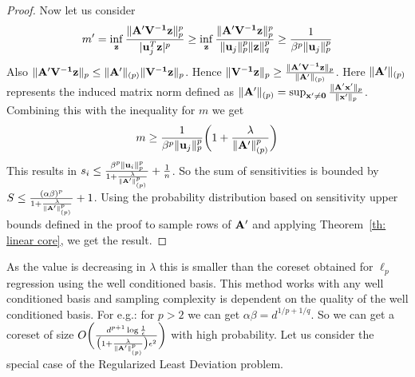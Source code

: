 \begin{proof}
Now let us consider
$$m'=\inf_{\mathbf{z}}\frac{\|\mathbf{A'V^{-1}z}\|_p^p}{|\mathbf{u}_j^T\mathbf{z}|^p}
\geq \inf_{\mathbf{z}}\frac{\|\mathbf{A'V^{-1}z}\|_p^p}{\|\mathbf{u}_j\|_p^p\|\mathbf{z}\|_q^p}
\geq \frac{1}{\beta^p \|\mathbf{u}_j\|_p^p}$$
Also  $\|\mathbf{A'V^{-1}z}\|_p \leq \|\mathbf{A'}\|_{(p)}\|\mathbf{V^{-1}z}\|_p$. Hence $\|\mathbf{V^{-1}z}\|_p \geq \frac{\|\mathbf{A'V^{-1}z}\|_p}{\|\mathbf{A'}\|_{(p)}}$. Here $\|\mathbf{A'}\|_{(p)}$ represents the induced matrix norm defined as $\|\mathbf{A'}\|_{(p)}= \sup_{\mathbf{x'} \neq \mathbf{0}}\frac{\|\mathbf{A'x'}\|_p}{\|\mathbf{x'}\|_p}$. Combining this with the inequality for $m$ we get
\begin{equation*}
m \geq \frac{1}{\beta^p\|\mathbf{u}_j\|_p^p}\bigg(1+ \frac{\lambda}{\|\mathbf{A'}\|_{(p)}^p}\bigg) 
\end{equation*}
This results in $s_i \leq \frac{\beta^p\|\mathbf{u}_i\|_p^p}{1+ \frac{\lambda}{\|\mathbf{A'}\|_{(p)}^p}}+ \frac{1}{n}$.  So the sum of sensitivities is bounded by $S \leq \frac{(\alpha\beta)^p}{1+ \frac{\lambda}{\|\mathbf{A'}\|_{(p)}^p}} +1 $.
Using the probability distribution based on sensitivity upper bounds defined in the proof to sample rows of $\mathbf{A'}$ and applying Theorem~\ref{th: linear core}, we get the result. 
\end{proof}
% 
As the value is decreasing in $\lambda$ this is smaller than the coreset obtained for $\ell_p$ regression using the well conditioned basis. This method works with any well conditioned basis and sampling complexity is dependent on the quality of the well conditioned basis. For e.g.: for $p >2$ we can get $\alpha\beta = d^{1/p + 1/q}$. So we can get a coreset of size $O\bigg(\frac{d^{p+1}\log{\frac{1}{\epsilon}}}{\big(1+\frac{\lambda}{\|\mathbf{A'}\|_{(p)}^p}\big)\epsilon^2}\bigg)$ with high probability.
Let us consider the special case of the Regularized Least Deviation problem.
% 
